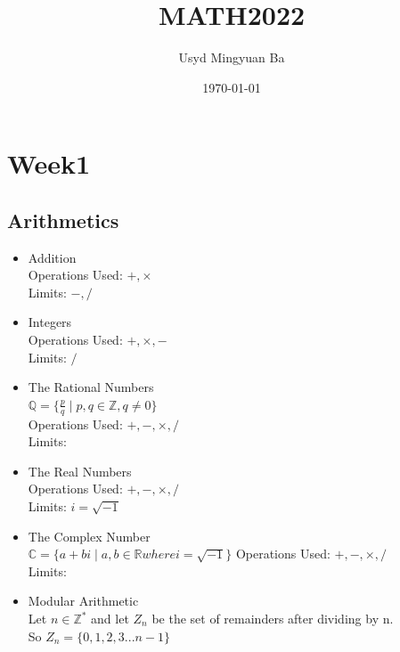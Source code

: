 \documentclass{article}
\title{MATH2022}
\author{Usyd Mingyuan Ba}
\date{\today}
\begin{document}
\maketitle

\section{Week1}
\subsection{Arithmetics} %
\begin{itemize}

\item Addition \\
Operations Used: $+,\times$ \\
Limits: $-,/$ 

\item Integers \\
Operations Used: $+,\times,-$ \\
Limits: $/$ 

\item The Rational Numbers  \\
$\mathbb{Q} = \{\frac{p}{q} \mid p,q \in \mathbb{Z}, q \neq 0\}$\\
Operations Used: $+,-,\times,/$ \\
Limits: 

\item The Real Numbers  \\
Operations Used: $+,-,\times,/$ \\
Limits: $i = \sqrt{-1}$ 

\item The Complex Number  \\
$\mathbb{C} = \{a+bi \mid a,b\in \mathbb{R} where i = \sqrt{-1}\}$
Operations Used: $+,-,\times,/$ \\
Limits: 

\item Modular Arithmetic  \\
Let $n \in \mathbb{Z^{*}}$ and let $Z_n$ be the set
of remainders after dividing by n.\\
So $Z_n = \{0,1,2,3 ... n-1\}$

\end{itemize}
\end{document}
